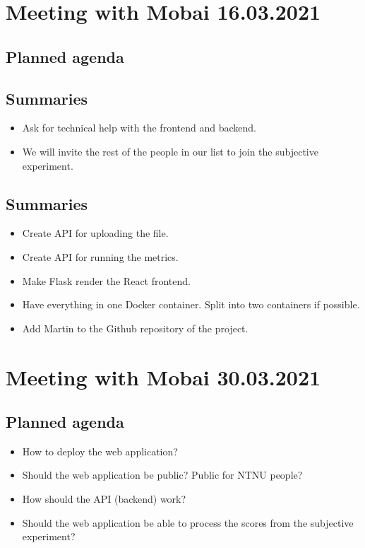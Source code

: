 \section*{Meeting with Mobai 16.03.2021}
\subsection*{Planned agenda}
\subsection*{Summaries}
\begin{itemize}
    \item Ask for technical help with the frontend and backend.
    \item We will invite the rest of the people in our list to join the subjective experiment.
\end{itemize}

\subsection*{Summaries}
\begin{itemize}
    \item Create API for uploading the file.
    \item Create API for running the metrics. 
    \item Make Flask render the React frontend. 
    \item Have everything in one Docker container. Split into two containers if possible.
    \item Add Martin to the Github repository of the project.
\end{itemize}

\newpage

\section*{Meeting with Mobai 30.03.2021}
\subsection*{Planned agenda}
\begin{itemize}
    \item How to deploy the web application?
    \item Should the web application be public? Public for NTNU people?
    \item How should the API (backend) work?
    \item Should the web application be able to process the scores from the subjective experiment?
\end{itemize}

